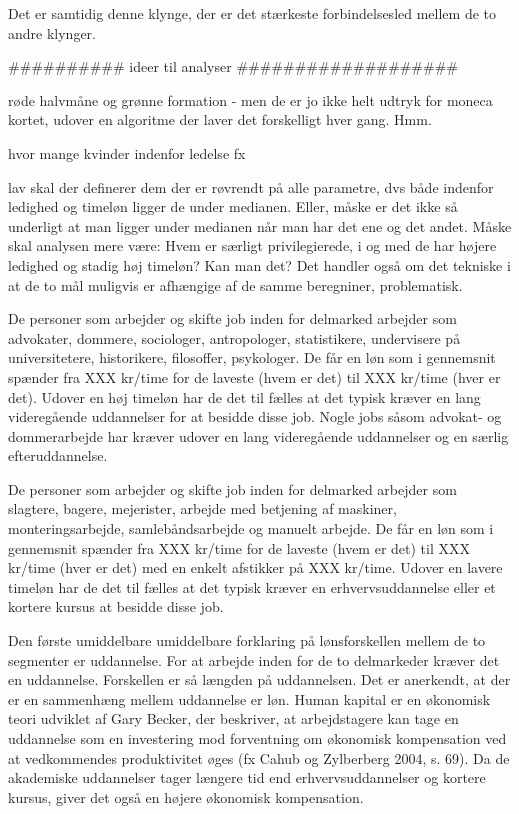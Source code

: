 Det er samtidig denne klynge, der er det stærkeste forbindelsesled mellem de to andre klynger. 








\iffalse


########## ideer til analyser ###################

røde halvmåne og grønne formation - men de er jo ikke helt udtryk for moneca kortet, udover en algoritme der laver det forskelligt hver gang. Hmm. 

hvor mange kvinder indenfor ledelse fx 


lav skal der definerer dem der er røvrendt på alle parametre, dvs både indenfor ledighed og timeløn ligger de under medianen. Eller, måske er det ikke så underligt at man ligger under medianen når man har det ene og det andet. Måske skal analysen mere være: Hvem er særligt privilegierede, i og med de har højere ledighed og stadig høj timeløn? Kan man det? Det handler også om det tekniske i at de to mål muligvis er afhængige af de samme beregniner, problematisk. 


De personer som arbejder og skifte job inden for delmarked  arbejder som advokater, dommere, sociologer, antropologer, statistikere, undervisere på universitetere, historikere, filosoffer, psykologer. De får en løn som i gennemsnit spænder fra XXX kr/time for de laveste (hvem er det) til XXX kr/time (hver er det). Udover en høj timeløn har de det til fælles at det typisk kræver en lang videregående uddannelser for at besidde disse job. Nogle jobs såsom advokat- og dommerarbejde har kræver udover en lang videregående uddannelser og en særlig efteruddannelse.

De personer som arbejder og skifte job inden for delmarked  arbejder som slagtere, bagere, mejerister, arbejde med betjening af maskiner, monteringsarbejde, samlebåndsarbejde og manuelt arbejde. De får en løn som i gennemsnit spænder fra XXX kr/time for de laveste (hvem er det) til XXX kr/time (hver er det) med en enkelt afstikker på XXX kr/time. Udover en lavere timeløn har de det til fælles at det typisk kræver en erhvervsuddannelse eller et kortere kursus at besidde disse job.

Den første umiddelbare umiddelbare forklaring på lønsforskellen mellem de to segmenter er uddannelse. For at arbejde inden for de to delmarkeder kræver det en uddannelse. Forskellen er så længden på uddannelsen. Det er anerkendt, at der er en sammenhæng mellem uddannelse er løn. Human kapital er en økonomisk teori udviklet af Gary Becker, der beskriver, at arbejdstagere kan tage en uddannelse som en investering mod forventning om økonomisk kompensation ved at vedkommendes produktivitet øges (fx Cahub og Zylberberg 2004, s. 69). Da de akademiske uddannelser tager længere tid end erhvervsuddannelser og kortere kursus, giver det også en højere økonomisk kompensation. 





